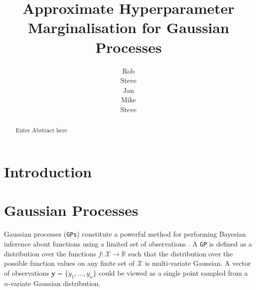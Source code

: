 \documentclass{article}
\title{Approximate Hyperparameter Marginalisation for Gaussian Processes}
\author{
Rob\\
\And
Steve\\
\And
Jan\\
\And
Mike\\
\And
Steve\\}
\begin{document}
\maketitle

\begin{abstract}
Enter Abstract here
\end{abstract}


\section{Introduction}



\section{Gaussian Processes}

Gaussian processes (\verb"GPs") constitute a powerful method for performing Bayesian inference about functions using a limited set of observations \cite{rassandwill}. A \verb"GP" is defined as a distribution over the functions $f : \mathcal{X} \rightarrow \mathbb{R}$ such that the distribution over the possible function values on any finite set of $\mathcal{X}$ is multi-variate Gaussian. A vector of observations $\mathbf{y} = \{ y_1,...,y_n\}$ could be viewed as a single point sampled from a $n$-variate Gaussian distribution.
\end{document}
